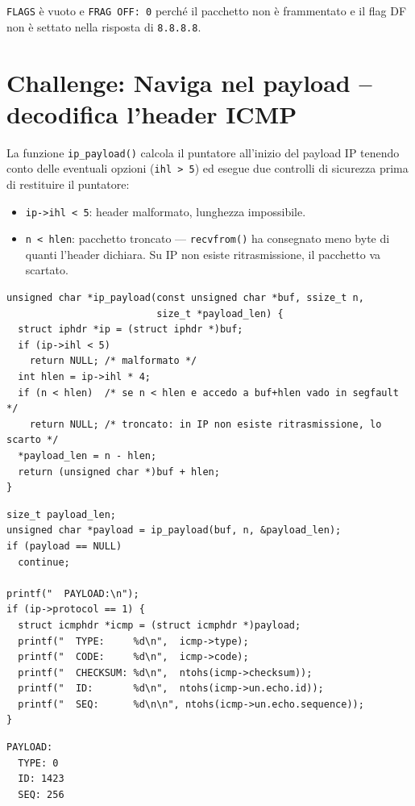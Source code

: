 \documentclass[a4paper,12pt]{article}
\begin{document}
\texttt{FLAGS} è vuoto e \texttt{FRAG OFF: 0} perché il pacchetto non è frammentato
e il flag DF non è settato nella risposta di \texttt{8.8.8.8}.

\section{Challenge: Naviga nel payload -- decodifica l'header ICMP}

La funzione \texttt{ip\_payload()} calcola il puntatore all'inizio del payload IP
tenendo conto delle eventuali opzioni (\texttt{ihl > 5}) ed esegue due controlli
di sicurezza prima di restituire il puntatore:

\begin{itemize}
  \item \texttt{ip->ihl < 5}: header malformato, lunghezza impossibile.
  \item \texttt{n < hlen}: pacchetto troncato — \texttt{recvfrom()} ha consegnato
        meno byte di quanti l'header dichiara. Su IP non esiste ritrasmissione,
        il pacchetto va scartato.
\end{itemize}

\begin{lstlisting}[caption={ip\_payload() -- implementazione}]
unsigned char *ip_payload(const unsigned char *buf, ssize_t n,
                          size_t *payload_len) {
  struct iphdr *ip = (struct iphdr *)buf;
  if (ip->ihl < 5)
    return NULL; /* malformato */
  int hlen = ip->ihl * 4;
  if (n < hlen)  /* se n < hlen e accedo a buf+hlen vado in segfault */
    return NULL; /* troncato: in IP non esiste ritrasmissione, lo scarto */
  *payload_len = n - hlen;
  return (unsigned char *)buf + hlen;
}
\end{lstlisting}

\begin{lstlisting}[caption={Uso nel loop -- decodifica header ICMP}]
size_t payload_len;
unsigned char *payload = ip_payload(buf, n, &payload_len);
if (payload == NULL)
  continue;

printf("  PAYLOAD:\n");
if (ip->protocol == 1) {
  struct icmphdr *icmp = (struct icmphdr *)payload;
  printf("  TYPE:     %d\n",  icmp->type);
  printf("  CODE:     %d\n",  icmp->code);
  printf("  CHECKSUM: %d\n",  ntohs(icmp->checksum));
  printf("  ID:       %d\n",  ntohs(icmp->un.echo.id));
  printf("  SEQ:      %d\n\n", ntohs(icmp->un.echo.sequence));
}
\end{lstlisting}
\newpage
\begin{lstlisting}[language={}, caption={Output -- ICMP Echo Reply da 8.8.8.8}]
  PAYLOAD:
  TYPE: 0
  ID: 1423
  SEQ: 256
\end{lstlisting}
\end{document}

